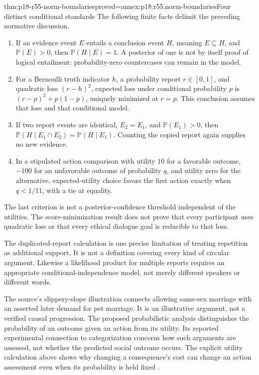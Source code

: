 \begin{hbtheorem}{thm:p18-r55-norm-boundaries}{proved=annex:p18.r55.norm-boundaries}{Four distinct conditional standards}
The following finite facts delimit the preceding normative discussion.
\begin{enumerate}
\item If an evidence event \(E\) entails a conclusion event \(H\),
      meaning \(E\subseteq H\), and \(\mathbb P(E)>0\), then
      \(\mathbb P(H\mid E)=1\). A posterior of one is not by
      itself proof of logical entailment: probability-zero countercases
      can remain in the model.
\item For a Bernoulli truth indicator \(h\), a probability report
      \(r\in[0,1]\), and quadratic loss \((r-h)^2\), expected
      loss under conditional probability \(p\) is
      \((r-p)^2+p(1-p)\), uniquely minimized at \(r=p\).
      This conclusion assumes that loss and that conditional model.
\item If two report events are identical, \(E_2=E_1\), and
      \(\mathbb P(E_1)>0\), then
      \(\mathbb P(H\mid E_1\cap E_2)=\mathbb P(H\mid E_1)\).
      Counting the copied report again supplies no new evidence.
\item In a stipulated action comparison with utility \(10\) for a
      favorable outcome, \(-100\) for an unfavorable outcome of
      probability \(q\), and utility zero for the alternative,
      expected-utility choice favors the first action exactly when
      \(q<1/11\), with a tie at equality.
\end{enumerate}
The last criterion is not a posterior-confidence threshold independent
of the utilities. The score-minimization result does not prove that
every participant uses quadratic loss or that every ethical dialogue
goal is reducible to that loss.
\end{hbtheorem}

The duplicated-report calculation is one precise limitation of treating
repetition as additional support. It is not a definition covering every
kind of circular argument. Likewise a likelihood product for multiple
reports requires an appropriate conditional-independence model, not
merely different speakers or different words.

The source's slippery-slope illustration connects allowing same-sex
marriage with an asserted later demand for pet marriage. It is an
illustrative argument, not a verified causal progression. The proposed
probabilistic analysis distinguishes the probability of an outcome
given an action from its utility. Its reported experimental connection
to categorization concerns how such arguments are assessed, not whether
the predicted social outcome occurs. The explicit utility calculation
above shows why changing a consequence's cost can change an action
assessment even when its probability is held fixed
\cite[p.~363]{HahnCollins2021ArgumentationTheory}.

